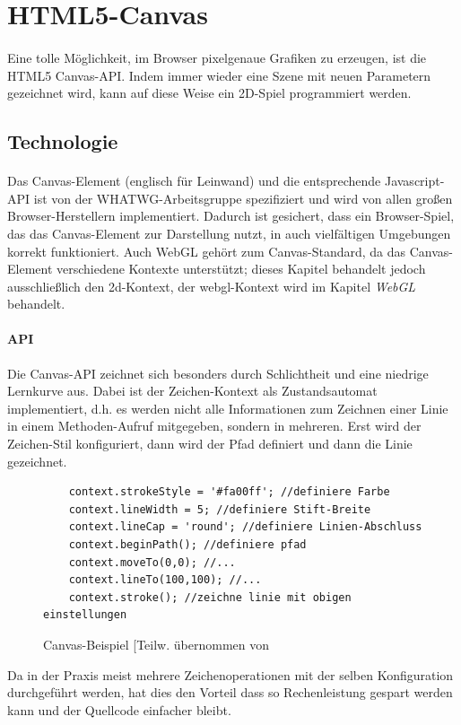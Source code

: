 \documentclass[a4paper, 12pt]{article}
\begin{document}
\section{HTML5-Canvas}
\paragraph{} Eine tolle Möglichkeit, im Browser pixelgenaue Grafiken zu erzeugen, ist die HTML5 Canvas-API. Indem immer wieder eine Szene mit neuen Parametern gezeichnet wird, kann auf diese Weise ein 2D-Spiel programmiert werden.
\subsection{Technologie}
\paragraph{} Das Canvas-Element (englisch für Leinwand) und die entsprechende Javascript-API ist von der WHATWG-Arbeitsgruppe spezifiziert und wird von allen großen Browser-Herstellern implementiert. Dadurch ist gesichert, dass ein Browser-Spiel, das das Canvas-Element zur Darstellung nutzt, in auch vielfältigen  Umgebungen korrekt funktioniert. Auch WebGL gehört zum Canvas-Standard, da das Canvas-Element verschiedene Kontexte unterstützt; dieses Kapitel behandelt jedoch ausschließlich den \glqq 2d\grqq-Kontext, der \glqq webgl\grqq-Kontext wird im Kapitel \emph{WebGL} behandelt.
\paragraph{API} Die Canvas-API zeichnet sich besonders durch Schlichtheit und eine niedrige Lernkurve aus. Dabei ist der Zeichen-Kontext als Zustandsautomat implementiert, d.h. es werden nicht alle Informationen zum Zeichnen einer Linie in einem Methoden-Aufruf mitgegeben, sondern in mehreren. Erst wird der Zeichen-Stil konfiguriert, dann wird der Pfad definiert und dann die Linie gezeichnet.\cite{CanvasSpec}
\begin{figure}[h!]
	\begin{verbatim}
	context.strokeStyle = '#fa00ff'; //definiere Farbe
	context.lineWidth = 5; //definiere Stift-Breite
	context.lineCap = 'round'; //definiere Linien-Abschluss
	context.beginPath(); //definiere pfad
	context.moveTo(0,0); //...
	context.lineTo(100,100); //...
	context.stroke(); //zeichne linie mit obigen einstellungen
	\end{verbatim}
	\caption{Canvas-Beispiel [Teilw. übernommen von \cite{CanvasExample}}
	\label{canvas-example}
\end{figure}
Da in der Praxis meist mehrere Zeichenoperationen mit der selben Konfiguration durchgeführt werden, hat dies den Vorteil dass so Rechenleistung gespart werden kann und der Quellcode einfacher bleibt.
\end{document}
